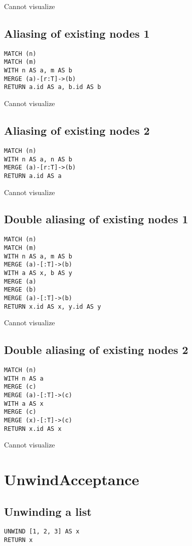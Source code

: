 Cannot visualize
\subsection{Aliasing of existing nodes 1}

\begin{lstlisting}
MATCH (n)
MATCH (m)
WITH n AS a, m AS b
MERGE (a)-[r:T]->(b)
RETURN a.id AS a, b.id AS b
\end{lstlisting}

Cannot visualize
\subsection{Aliasing of existing nodes 2}

\begin{lstlisting}
MATCH (n)
WITH n AS a, n AS b
MERGE (a)-[r:T]->(b)
RETURN a.id AS a
\end{lstlisting}

Cannot visualize
\subsection{Double aliasing of existing nodes 1}

\begin{lstlisting}
MATCH (n)
MATCH (m)
WITH n AS a, m AS b
MERGE (a)-[:T]->(b)
WITH a AS x, b AS y
MERGE (a)
MERGE (b)
MERGE (a)-[:T]->(b)
RETURN x.id AS x, y.id AS y
\end{lstlisting}

Cannot visualize
\subsection{Double aliasing of existing nodes 2}

\begin{lstlisting}
MATCH (n)
WITH n AS a
MERGE (c)
MERGE (a)-[:T]->(c)
WITH a AS x
MERGE (c)
MERGE (x)-[:T]->(c)
RETURN x.id AS x
\end{lstlisting}

Cannot visualize
\section{UnwindAcceptance}

\subsection{Unwinding a list}

\begin{lstlisting}
UNWIND [1, 2, 3] AS x
RETURN x
\end{lstlisting}


